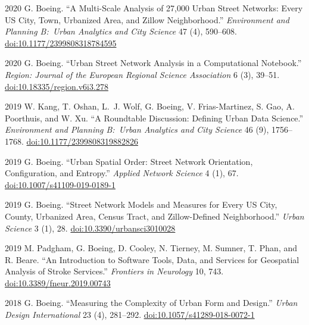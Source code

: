 \documentclass[12pt,letterpaper]{report}
\begin{document}
\begin{tablist}
        \item[2020] \tab{}G. Boeing. \enquote{A Multi-Scale Analysis of 27,000 Urban Street Networks: Every US City, Town, Urbanized Area, and Zillow Neighborhood.} \textit{Environment and Planning B:\ Urban Analytics and City Science} 47 (4), 590--608. \href{https://doi.org/10.1177/2399808318784595}{doi:10.1177/2399808318784595}

        \item[2020] \tab{}G. Boeing. \enquote{Urban Street Network Analysis in a Computational Notebook.} \textit{Region: Journal of the European Regional Science Association} 6 (3), 39--51. \href{https://doi.org/10.18335/region.v6i3.278}{doi:10.18335/region.v6i3.278}

        \item[2019] \tab{}W. Kang, T. Oshan, L.~J. Wolf, G. Boeing, V. Frias-Martinez, S. Gao, A. Poorthuis, and W. Xu. \enquote{A Roundtable Discussion: Defining Urban Data Science.} \textit{Environment and Planning B:\ Urban Analytics and City Science} 46 (9), 1756--1768. \href{https://doi.org/10.1177/2399808319882826}{doi:10.1177/2399808319882826}

        \item[2019] \tab{}G. Boeing. \enquote{Urban Spatial Order: Street Network Orientation, Configuration, and Entropy.} \textit{Applied Network Science} 4 (1), 67. \href{https://doi.org/10.1007/s41109-019-0189-1}{doi:10.1007/s41109-019-0189-1}

        \item[2019] \tab{}G. Boeing. \enquote{Street Network Models and Measures for Every US City, County, Urbanized Area, Census Tract, and Zillow-Defined Neighborhood.} \textit{Urban Science} 3 (1), 28. \href{https://doi.org/10.3390/urbansci3010028}{doi:10.3390/urbansci3010028}

        \item[2019] \tab{}M. Padgham, G. Boeing, D. Cooley, N. Tierney, M. Sumner, T. Phan, and R. Beare. \enquote{An Introduction to Software Tools, Data, and Services for Geospatial Analysis of Stroke Services.} \textit{Frontiers in Neurology} 10, 743. \href{https://doi.org/10.3389/fneur.2019.00743}{doi:10.3389/fneur.2019.00743}

        \item[2018] \tab{}G. Boeing. \enquote{Measuring the Complexity of Urban Form and Design.} \textit{Urban Design International} 23 (4), 281--292. \href{https://doi.org/10.1057/s41289-018-0072-1}{doi:10.1057/s41289-018-0072-1}


\end{tablist}
\end{document}
